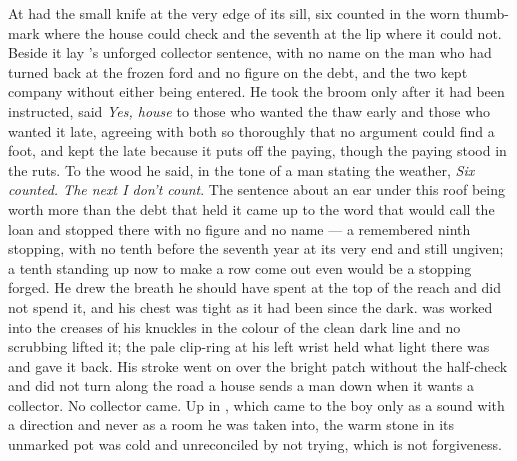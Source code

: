 At   had the small knife at the very edge of its sill, six counted in the worn thumb-mark where the house could check and the seventh at the lip where it could not. Beside it lay 's unforged collector sentence, with no name on the man who had turned back at the frozen ford and no figure on the debt, and the two kept company without either being entered. He took the broom only after it had been instructed, said \emph{Yes, house} to those who wanted the thaw early and those who wanted it late, agreeing with both so thoroughly that no argument could find a foot, and kept the late because it puts off the paying, though the paying stood in the ruts. To the wood he said, in the tone of a man stating the weather, \emph{Six counted. The next I don't count}. The sentence about an ear under this roof being worth more than the debt that held it came up to the word that would call the loan and stopped there with no figure and no name --- a remembered ninth stopping, with no tenth before the seventh year at its very end and still ungiven; a tenth standing up now to make a row come out even would be a stopping forged. He drew the breath he should have spent at the top of the reach and did not spend it, and his chest was tight as it had been since the dark.  was worked into the creases of his knuckles in the colour of the clean dark line and no scrubbing lifted it; the pale clip-ring at his left wrist held what light there was and gave it back. His stroke went on over the bright patch without the half-check and did not turn along the road a house sends a man down when it wants a collector. No collector came. Up in , which came to the boy only as a sound with a direction and never as a room he was taken into, the warm stone in its unmarked pot was cold and unreconciled by not trying, which is not forgiveness.

